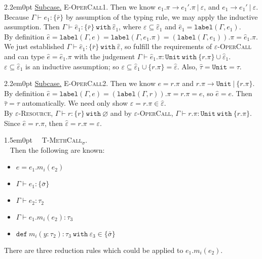 \documentclass{llncs}
\newcommand{\keywadj}[1]{\mathtt{#1}}
\newcommand{\keyw}[1]{\keywadj{#1}~}
\newcommand{\proofcase}[2]{
	\begin{adjustwidth}{1.5em}{0pt}
		\fbox{Case.}~~#1. \\ ~#2
	\end{adjustwidth}
}
\newcommand{\subcase}[1] {
	\begin{adjustwidth}{2.2em}{0pt}
		\underline{Subcase.} #1
	\end{adjustwidth}
}
\newcommand{\type}[2]{
	#1~\keyw{with} #2
}
\begin{document}
{{	\subcase{\textsc{E-OperCall1}.
		Then we know $e_1.\pi \longrightarrow e_1'.\pi~|~\varepsilon$, and $e_1 \rightarrow e_1'~|~\varepsilon$. Because $\Gamma \vdash e_1 : \{ \bar r \}$ by assumption of the typing rule, we may apply the inductive assumption. Then $\Gamma \vdash \hat e_1 : \type{\{ \bar r \}}{\hat \varepsilon_1$, where $\varepsilon \subseteq \hat \varepsilon_1$ and $\hat e_1 = \keywadj{label}(\Gamma, e_1)$.\\

\noindent
By definition $\hat e = \keywadj{label}(\Gamma, e) = \keywadj{label}(\Gamma, e_1.\pi) = (\keywadj{label}(\Gamma, e_1)).\pi = \hat e_1.\pi$. We just established $\Gamma \vdash \hat e_1 : \type{\{ \bar r \}}{\hat \varepsilon}$, so fulfill the requirements of \textsc{$\varepsilon$-OperCall} and can type $\hat e = \hat e_1.\pi$ with the judgement $\Gamma \vdash \hat e_1.\pi : \type{\keywadj{Unit}}{\{ r.\pi \} \cup \hat \varepsilon_1}$. \\

\noindent
$\varepsilon \subseteq \hat \varepsilon_1$ is an inductive assumption; so $\varepsilon \subseteq \hat \varepsilon_1 \cup \{ r.\pi \} = \hat \varepsilon$. Also, $\hat \tau = \keywadj{Unit} = \tau$.\\
		}
	}
	
	\subcase{\textsc{E-OperCall2}.
		Then we know $e = r.\pi$ and $r.\pi \longrightarrow \keywadj{Unit}~|~\{ r.\pi \}$. By definition $\hat e = \keywadj{label}(\Gamma, e) = (\keywadj{label}(\Gamma, r)).\pi = r.\pi = e$, so $\hat e = e$. Then $\hat \tau = \tau$ automatically. We need only show $\varepsilon = r.\pi \in \hat \varepsilon$.\\
		
\noindent
By \textsc{$\varepsilon$-Resource}, $\Gamma \vdash r : \type{ \{ r \} }{\varnothing}$ and by \textsc{$\varepsilon$-OperCall}, $\Gamma \vdash r.\pi : \type{\keywadj{Unit}}{\{ r.\pi \}}$. Since $\hat e = r.\pi$, then $\hat \varepsilon = r.\pi = \varepsilon$.\\
	}
}

\proofcase{\textsc{T-MethCall$_\sigma$}}{
Then the following are known:
\begin{itemize}
	\item $e = e_1.m_i(e_2)$
	\item $\Gamma \vdash e_1 : \{ \bar \sigma \}$
	\item $\Gamma \vdash e_2 : \tau_2$
	\item $\Gamma \vdash e_1.m_i(e_2) : \tau_3$
	\item $\keywadj{def}~m_i(y:\tau_2) : \type{\tau_3}{\varepsilon_3} \in \{ \bar \sigma \}$
\end{itemize}
There are three reduction rules which could be applied to $e_1.m_i(e_2)$.

}}
\end{document}
